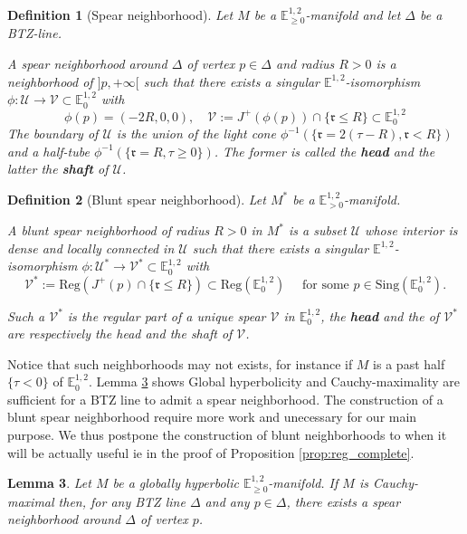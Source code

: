 \documentclass[a4paper,12pt]{article}
\def\r{\mathfrak{r}}
\def\U{\mathcal U}
\def\V{\mathcal V}
\def\sing{\mathrm{Sing}}
\newcommand{\mass}[1]{{\mathbb E}^{1,2}_{#1}}
\def\Reg{\mathrm{Reg}}
\def\reg{\Reg}
\newtheorem{lemou}{Lemma}[section]          %
\newtheorem{defou}[lemou]{Definition}    %
\begin{document}
   \begin{defou}[Spear neighborhood] Let $M$ be a $\mass{\geq0}$-manifold and let $\Delta$ be a BTZ-line. 
   
   
   A spear neighborhood around $\Delta$ of vertex $p\in \Delta$ and radius $R>0$ is a neighborhood of $]p,+\infty[$ such that there exists a singular $\mass{}$-isomorphism 
   $\phi: \U\rightarrow \V\subset \mass{0}$ with 
   $$\phi(p)=(-2R,0,0),\quad  \V:= J^+(\phi(p)) \cap \{\r\leq R\}\subset \mass{0}$$ 
   The boundary of $\U$ is the union of the light cone $\phi^{-1}(\{\r = 2(\tau-R),\r<R\})$ and a half-tube $\phi^{-1}(\{\r=R, \tau\geq 0\})$. The former is called the \textbf{head} and the latter the \textbf{shaft} of $\U$.
   

  \end{defou}
  \begin{defou}[Blunt spear neighborhood]
  Let $M^*$ be a $\mass{>0}$-manifold.
  
   A blunt spear neighborhood of radius $R>0$ in $M^*$ is a subset $\U$ whose interior is dense and locally connected in $\U$ such that there exists a singular $\mass{}$-isomorphism 
   $\phi: \U^*\rightarrow \V^*\subset \mass{0}$ with 
   $$ \V^*:= \reg(J^+(p) \cap \{\r\leq R\})\subset \reg(\mass{0}) \quad\text{ for some } p \in \sing(\mass{0}).$$ 
   
   Such a $\V^*$ is the regular part of a unique spear $\V$ in $\mass{0}$, the \textbf{head} and the  of $\V^*$ are respectively the head and the shaft of $\V$.
  \end{defou}
 Notice that such neighborhoods may not exists, for instance if $M$ is a past half  $\{\tau<0\}$  of $\mass{0}$.  Lemma \ref{lem:tube} shows Global hyperbolicity and Cauchy-maximality are sufficient for a BTZ line  to admit a spear neighborhood.
 The construction of a blunt spear neighborhood require more work and unecessary for our main purpose. We thus postpone the construction of blunt neighborhoods to when it will be actually useful ie in the proof of Proposition \ref{prop:reg_complete}.
   
   

    \begin{lemou} \label{lem:tube}
	  Let $M$  be a globally hyperbolic $\mass{\geq0}$-manifold.
	 If  $M$ is Cauchy-maximal then, for any  BTZ line $\Delta$ and any $p\in \Delta$, there exists a spear neighborhood around $\Delta$ of vertex $p$.
	\end{lemou}
   
      
\end{document}
